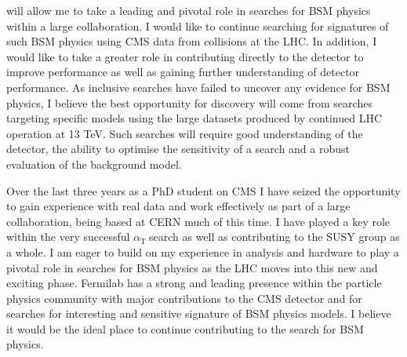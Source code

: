 \documentclass[11pt]{article}
\theoremstyle{plain} \numberwithin{equation}{section}
\theoremstyle{definition}
\DeclareRobustCommand{\alphat}{$\alpha_{\text{T}}~$}
\begin{document}
will allow me to take a leading and pivotal role in searches for BSM physics within a large collaboration.
I would like to continue searching for signatures of such BSM physics using CMS data from collisions at the LHC.
In addition, I would like to take a greater role in contributing directly to the detector to improve performance
as well as gaining further understanding of detector performance. As inclusive searches have failed 
to uncover any evidence for BSM physics, I believe the best opportunity for discovery will 
come from searches targeting specific models using the large datasets produced 
by continued LHC operation at 13 TeV. Such searches will require good understanding of the detector,
the ability to optimise the sensitivity of a search and a robust evaluation of the background model.

Over the last three years as a PhD student on CMS I have seized the opportunity to gain experience with real data
and work effectively as part of a large collaboration, being based at CERN much of this time. I have played 
a key role within the very successful \alphat search as well as contributing to the SUSY group as a whole.
I am eager to build on my experience in analysis and hardware to play a pivotal role in searches for BSM physics as the LHC
moves into this new and exciting phase. Fermilab has a strong and leading presence within the particle
physics community with major contributions to the CMS detector and for searches for interesting and sensitive signature
of BSM physics models. I believe it would be the ideal place to continue contributing to the search for BSM physics.

\end{document}
